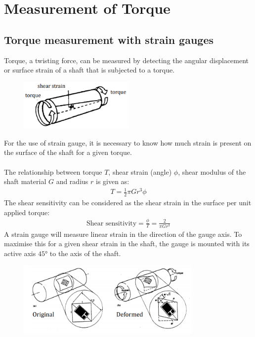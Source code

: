 \documentclass[class=report, crop=false, 12pt,a4paper]{standalone}
\begin{document}
\section{Measurement of Torque}
\subsection{Torque measurement with strain gauges}
Torque, a twisting force, can be measured by detecting the angular displacement or surface strain of a shaft that is subjected to a torque.
\begin{figure}[H]
  \centering
  \includegraphics[width = 0.5\textwidth]{../img/Mdiagram49.png}
\end{figure}
For the use of strain gauge, it is necessary to know how much strain is present on the surface of the shaft for a given torque. \\\\
The relationship between torque $T$, shear strain (angle) $\phi$, shear modulus of the shaft material $G$ and radius $r$ is given as:
\begin{gather}
  T = \frac{1}{2}\pi Gr^3\phi 
\end{gather}
The shear sensitivity can be considered as the shear strain in the surface per unit applied torque:
\begin{gather}
  \text{Shear sensitivity} = \frac{\phi}{T} = \frac{2}{\pi Gr^3}
\end{gather}
A strain gauge will measure linear strain in the direction of the gauge axis. To maximise this for a given shear strain in the shaft, the gauge is mounted with its active axis $\ang{45}$ to the axis of the shaft.
\begin{figure}[H]
  \centering
  \includegraphics[width = 0.8\textwidth]{../img/Mdiagram50.png}
\end{figure}
\end{document}
